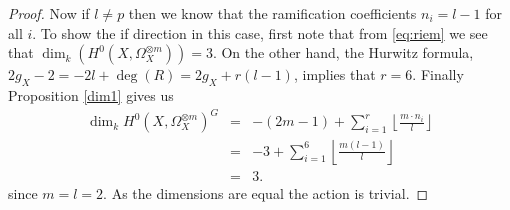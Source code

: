 \documentclass[11pt]{article} %
\begin{document}
\begin{proof}
    Now if $l\neq p$ then we know that the ramification coefficients $n_i=l-1$ for all $i$. 
    To show the if direction in this case, first note that from \eqref{eq:riem} we see that $\dim_k(H^0(X,\Omega_X^{\otimes m}))=3$. 
    On the other hand, the Hurwitz formula, $2g_X-2=-2l+\deg(R)=2g_X+r(l-1)$, implies that $r=6$. 
    Finally Proposition \ref{dim1} gives us
      \begin{eqnarray*}
	\dim_kH^0(X,\Omega_X^{\otimes m})^G & = & -(2m-1) + \sum_{i=1}^r \left\lfloor \frac{m\cdot n_i}{l} \right\rfloor\\
	& = & -3 +\sum_{i=1}^6 \left\lfloor \frac{m(l-1)}{l} \right\rfloor\\
	& = & 3.
      \end{eqnarray*}
    since $m=l=2$.
    As the dimensions are equal the action is trivial.



\end{proof}
\end{document}
